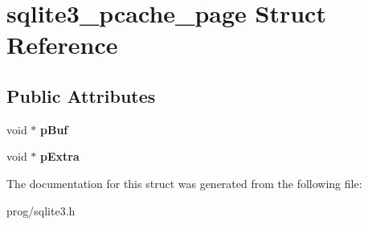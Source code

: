 \hypertarget{structsqlite3__pcache__page}{}\section{sqlite3\+\_\+pcache\+\_\+page Struct Reference}
\label{structsqlite3__pcache__page}
\subsection*{Public Attributes}
\begin{DoxyCompactItemize}
\item 
\mbox{\label{structsqlite3__pcache__page_a19aa6f5638fe2d4eee32aed37a119288}} 
void $\ast$ {\bfseries p\+Buf}
\item 
\mbox{\label{structsqlite3__pcache__page_a6356a15fc426a7558ddf34038f70a65f}} 
void $\ast$ {\bfseries p\+Extra}
\end{DoxyCompactItemize}


The documentation for this struct was generated from the following file\+:\begin{DoxyCompactItemize}
\item 
prog/sqlite3.\+h\end{DoxyCompactItemize}
